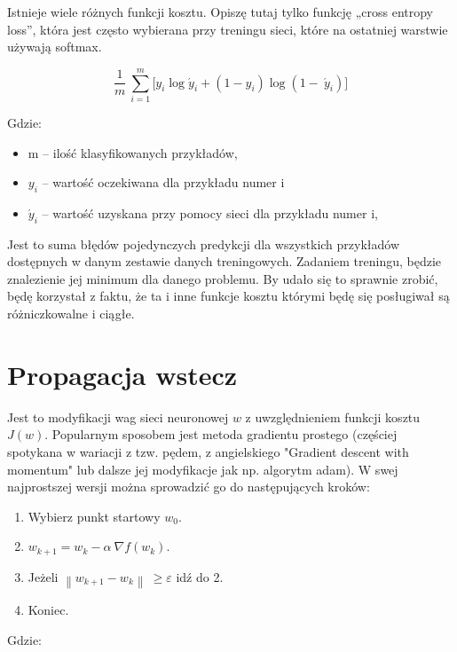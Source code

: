Istnieje wiele różnych funkcji kosztu. Opiszę tutaj tylko funkcję „cross entropy loss”, która jest często wybierana przy treningu sieci, które na ostatniej warstwie używają softmax.

\[\frac{1}{m}\ \sum_{i = 1}^{m}{\lbrack y_{i}\log{\acute{y}_{i} + \left( 1 - y_{i} \right)\log{(1 - \ \acute{y}_{i})}}\rbrack}\]

Gdzie:

\begin{itemize}
\item
  m -- ilość klasyfikowanych przykładów,
\item
  \(y_{i}\) -- wartość oczekiwana dla przykładu numer i
\item
    \(\acute{y}_{i}\) -- wartość uzyskana przy pomocy sieci dla przykładu numer i,
\end{itemize}

Jest to suma błędów pojedynczych predykcji dla wszystkich przykładów dostępnych w danym zestawie danych treningowych. Zadaniem treningu, będzie znalezienie jej minimum dla danego problemu. By udało się to sprawnie zrobić, będę korzystał z faktu, że ta i inne funkcje kosztu którymi będę się posługiwał są różniczkowalne i ciągłe.

\section{Propagacja wstecz}

Jest to modyfikacji wag sieci neuronowej \(w\) z uwzględnieniem funkcji kosztu \(J(w)\). Popularnym sposobem jest metoda gradientu prostego (częściej spotykana w wariacji z tzw. pędem, z angielskiego "Gradient descent with momentum" lub dalsze jej modyfikacje jak np. algorytm
adam). W swej najprostszej wersji można sprowadzić go do następujących kroków:

\begin{enumerate}
\def\labelenumi{\arabic{enumi}.}
\item
  Wybierz punkt startowy \(w_{0}\).
\item
  \(w_{k + 1} = w_{k} - \alpha\ \nabla f(w_{k})\).
\item
  Jeżeli \(\left\| w_{k + 1} - w_{k} \right\|\  \geq \varepsilon\) idź
  do 2.
\item
  Koniec.
\end{enumerate}

Gdzie:

